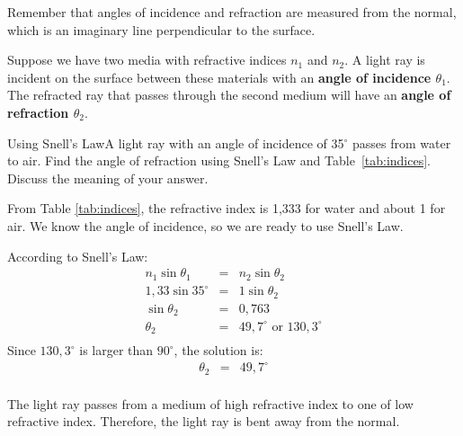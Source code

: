Remember that angles of incidence and refraction are measured from the normal, which is an imaginary line perpendicular to the surface. 

Suppose we have two media with refractive indices $n_1$ and $n_2$. A light ray is incident on the surface between these materials with an \textbf{angle of incidence $\theta_1$}. The refracted ray that passes through the second medium will have an \textbf{angle of refraction $\theta_2$}.

\pagebreak[4]
\begin{wex}{Using Snell's Law}{A light ray with an angle of incidence of 35$^{\circ}$ passes from water to air. Find the angle of refraction using Snell's Law and Table~\ref{tab:indices}. Discuss the meaning of your answer.}
{
From Table \ref{tab:indices}, the refractive index is 1,333 for water and about 1 for air. We know the angle of incidence, so we are ready to use Snell's Law.

According to Snell's Law:
\begin{eqnarray*}
n_1 \sin{\theta_1} & = & n_2 \sin{\theta_2} \\
1,33 \sin{35^{\circ}} & = & 1 \sin{\theta_2} \\
\sin{\theta_2} & = & 0,763\\
\theta_2 & = & 49,7^{\circ} \textrm{~or~} 130,3^{\circ}\\
\end{eqnarray*}
Since $130,3^{\circ}$ is larger than $90^{\circ}$, the solution is:
\begin{eqnarray*}
\theta_2 & = & 49,7^{\circ}\\
\end{eqnarray*}

The light ray passes from a medium of high refractive index to one of low refractive index. Therefore, the light ray is bent away from the normal.}
\end{wex}

